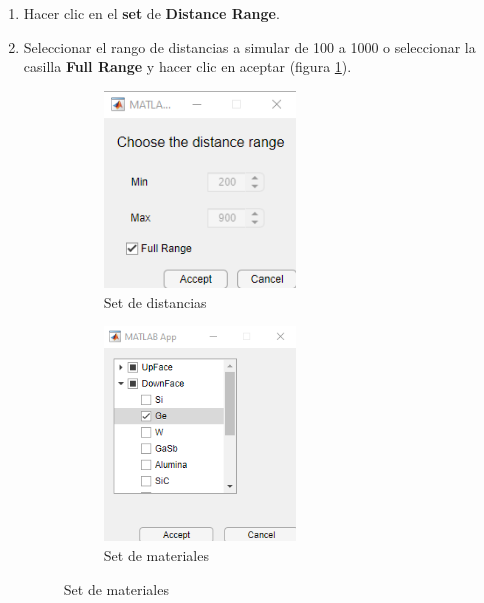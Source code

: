 \begin{enumerate}
	\item Hacer clic en el \textbf{set} de \textbf{Distance Range}.	
	\item Seleccionar el rango de distancias a simular de 100 a 1000 o seleccionar la casilla \textbf{Full Range} y hacer clic en aceptar (figura \ref{fig:set_distances}).%
	\begin{figure}[H]%
	\begin{subfigure}[b]{0.48\textwidth}
		\centering
			\includegraphics[width=0.6\textwidth]{figuras/Procedimiento_Simulaciones/Radiacion/set_distances_fullrange.png}
		\caption{Set de distancias}
		\label{fig:set_distances}
	\end{subfigure}
	\hfill
	\begin{subfigure}[b]{0.48\textwidth}
		\centering
			\includegraphics[width=0.6\textwidth]{figuras/Procedimiento_Simulaciones/Radiacion/set_materilas2.png}
		\caption{Set de materiales}
		\label{fig:set_materials}

\end{subfigure}
\end{figure}
\end{enumerate}
